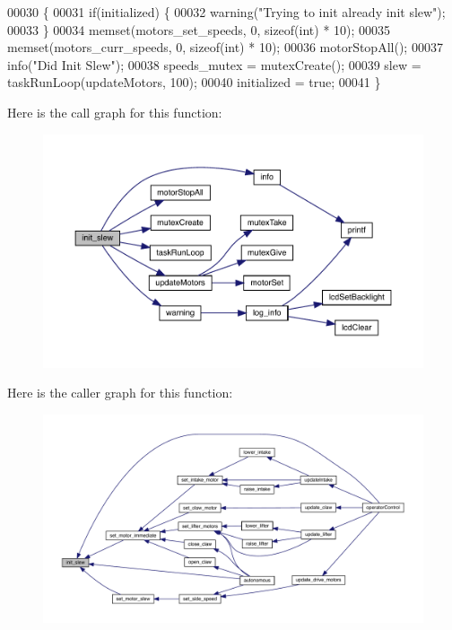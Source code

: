 \begin{DoxyCode}
00030                 \{
00031   \textcolor{keywordflow}{if}(initialized) \{
00032     warning(\textcolor{stringliteral}{"Trying to init already init slew"});
00033   \}
00034   memset(motors_set_speeds, 0, \textcolor{keyword}{sizeof}(\textcolor{keywordtype}{int}) * 10);
00035   memset(motors_curr_speeds, 0, \textcolor{keyword}{sizeof}(\textcolor{keywordtype}{int}) * 10);
00036   motorStopAll();
00037   info(\textcolor{stringliteral}{"Did Init Slew"});
00038   speeds_mutex = mutexCreate();
00039   slew = taskRunLoop(updateMotors, 100);
00040   initialized = \textcolor{keyword}{true};
00041 \}
\end{DoxyCode}
Here is the call graph for this function\+:\nopagebreak
\begin{figure}[H]
\begin{center}
\leavevmode
\includegraphics[width=350pt]{slew_8h_a321758941d88b75783955c819bb75005_cgraph}
\end{center}
\end{figure}
Here is the caller graph for this function\+:\nopagebreak
\begin{figure}[H]
\begin{center}
\leavevmode
\includegraphics[width=350pt]{slew_8h_a321758941d88b75783955c819bb75005_icgraph}
\end{center}
\end{figure}
\mbox{\label{slew_8h_a9f8b8ae577ef938622024545711f0151}} 
